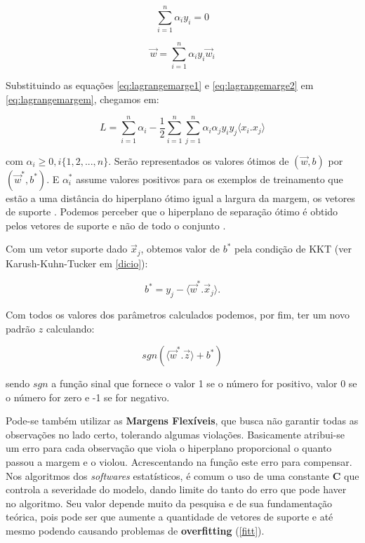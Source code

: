 \documentclass[
  openany]{book}
\begin{document}
\begin{equation}
\displaystyle \sum^n_{i=1}\alpha_i y_i=0
\label{eq:lagrangemarge1}
\end{equation}

\begin{equation}
\vec{w}=\displaystyle \sum^n_{i=1}\alpha_i y_i \vec{w}_i
\label{eq:lagrangemarge2}
\end{equation}

Substituindo as equações \eqref{eq:lagrangemarge1} e \eqref{eq:lagrangemarge2} em \eqref{eq:lagrangemargem}, chegamos em:

\begin{equation}
L =\displaystyle \sum^n_{i=1}\alpha_i-\frac{1}{2} \displaystyle \sum^n_{i=1}\sum^n_{j=1}\alpha_i\alpha_j y_i y_j \langle x_i.x_j\rangle
\label{eq:lagrangemarge3}
\end{equation}

com \(\alpha_i\geq0,i\{1,2,...,n\}\). Serão representados os valores ótimos de \((\vec{w},b)\) por \((\vec{w}^*,b^*)\). E \(\alpha^*_i\) assume valores positivos para os exemplos de treinamento que estão a uma distância do hiperplano ótimo igual a largura da margem, os vetores de suporte \citep{gonccalves2015maquina}. Podemos perceber que o hiperplano de separação ótimo é obtido pelos vetores de suporte e não de todo o conjunto \citep{lorena2003introduccaoas}.

Com um vetor suporte dado \(\vec{x}_j\), obtemos valor de \(b^*\) pela condição de KKT (ver Karush-Kuhn-Tucker em \ref{dicio}):

\begin{equation}
b^* =y_j-\langle\vec{w}^*.\vec{x}_j \rangle.
\label{eq:kktsvm}
\end{equation}

Com todos os valores dos parâmetros calculados podemos, por fim, ter um novo padrão \(z\) calculando:

\begin{equation}
sgn(\langle \vec{w}^* . \vec{z}\rangle+b^*)
\label{eq:sgn}
\end{equation}

sendo \(sgn\) a função sinal que fornece o valor 1 se o número for positivo, valor 0 se o número for zero e -1 se for negativo.

Pode-se também utilizar as \textbf{Margens Flexíveis}, que busca não garantir todas as observações no lado certo, tolerando algumas violações. Basicamente atribui-se um erro para cada observação que viola o hiperplano proporcional o quanto passou a margem e o violou. Acrescentando na função este erro para compensar. Nos algoritmos dos \emph{softwares} estatísticos, é comum o uso de uma constante \textbf{C} que controla a severidade do modelo, dando limite do tanto do erro que pode haver no algoritmo. Seu valor depende muito da pesquisa e de sua fundamentação teórica, pois pode ser que aumente a quantidade de vetores de suporte e até mesmo podendo causando problemas de \textbf{overfitting} (\ref{fitt}).
\end{document}
